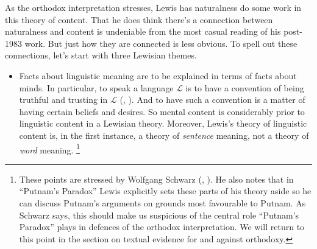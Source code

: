 \documentclass[
  11pt,
  letterpaper,
  DIV=11,
  numbers=noendperiod,
  twoside]{scrartcl}
\providecommand{\tightlist}{%
  \setlength{\itemsep}{0pt}\setlength{\parskip}{0pt}}
\begin{document}
As the orthodox interpretation stresses, Lewis has naturalness do some
work in this theory of content. That he does think there's a connection
between naturalness and content is undeniable from the most casual
reading of his post-1983 work. But just how they are connected is less
obvious. To spell out these connections, let's start with three Lewisian
themes.

\begin{itemize}
\tightlist
\item
  Facts about linguistic meaning are to be explained in terms of facts
  about minds. In particular, to speak a language \(\mathcal{L}\) is to
  have a convention of being truthful and trusting in \(\mathcal{L}\)
  (,
  ). And to have such a convention is a
  matter of having certain beliefs and desires. So mental content is
  considerably prior to linguistic content in a Lewisian theory.
  Moreover, Lewis's theory of linguistic content is, in the first
  instance, a theory of \emph{sentence} meaning, not a theory of
  \emph{word} meaning. \footnote{These points are stressed by Wolfgang
    Schwarz (,
    ). He also notes that in ``Putnam's
    Paradox'' Lewis explicitly sets these parts of his theory aside so
    he can discuss Putnam's arguments on grounds most favourable to
    Putnam. As Schwarz says, this should make us suspicious of the
    central role ``Putnam's Paradox'' plays in defences of the orthodox
    interpretation. We will return to this point in the section on
    textual evidence for and against orthodoxy.

}
\end{itemize}
\end{document}
